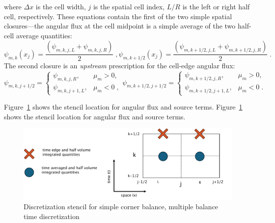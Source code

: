 where $\Delta x$ is the cell width, $j$ is the spatial cell index, $L/R$ is the left or right half cell, respectively.
These equations contain the first of the two simple spatial closures---the angular flux at the cell midpoint is a simple average of the two half-cell average quantities:
\begin{subequations}
\begin{equation}
  \psi_{m,k}(x_j) =  \frac{\left( \psi_{m,k,j,L} + \psi_{m,k,j,R} \right)}{2} \;,
\end{equation}
\begin{equation}
  \psi_{m,k+1/2}(x_j) =  \frac{\left( \psi_{m,k+1/2,j,L} + \psi_{m,k+1/2,j,R} \right)}{2} \;.
\end{equation}
\end{subequations}
The second closure is an \textit{upstream} prescription for the cell-edge angular flux:
\begin{subequations}
    \begin{equation}
      \psi_{m,k,j+1/2} =
      \begin{cases}
      \psi_{m,k,j,R}, & \mu_m > 0, \\
      \psi_{m,k,j+1,L}, & \mu_m < 0 \;,
      \end{cases}
    \end{equation}
    \begin{equation}
      \psi_{m,k+1/2,j+1/2} =
      \begin{cases}
      \psi_{m,k+1/2,j,R}, & \mu_m > 0, \\
      \psi_{m,k+1/2,j+1,L}, & \mu_m < 0 \;.
      \end{cases}
    \end{equation}
\end{subequations}

Figure~\ref{fig:stencil} shows the stencil location for angular flux and source terms.
Figure~\ref{fig:stencil} shows the stencil location for angular flux and source terms. 
\begin{figure}
    \centering
    \includegraphics[width=\textwidth]{figures/therefore_figs/stencil.pdf}
    \caption{Discretization stencil for simple corner balance, multiple balance time discretization}
    \label{fig:stencil}
\end{figure}

